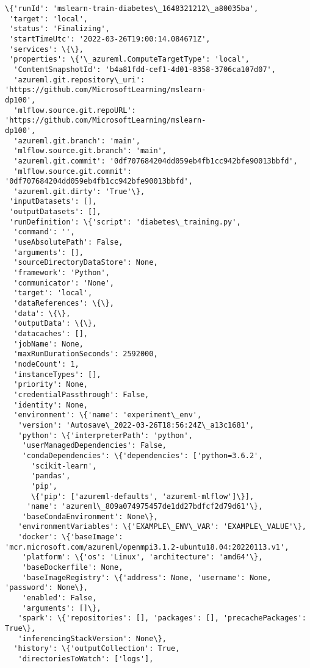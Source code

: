 \documentclass[11pt]{article}
\makeatletter
\newcommand{\boxspacing}{\kern\kvtcb@left@rule\kern\kvtcb@boxsep}
\newcommand{\prompt}[4]{
        {\ttfamily\llap{{\color{#2}[#3]:\hspace{3pt}#4}}\vspace{-\baselineskip}}
    }
\makeatother
\begin{document}
    
    
    
            \begin{tcolorbox}[breakable, size=fbox, boxrule=.5pt, pad at break*=1mm, opacityfill=0]
\prompt{Out}{outcolor}{4}{\boxspacing}
\begin{Verbatim}[commandchars=\\\{\}]
\{'runId': 'mslearn-train-diabetes\_1648321212\_a80035ba',
 'target': 'local',
 'status': 'Finalizing',
 'startTimeUtc': '2022-03-26T19:00:14.084671Z',
 'services': \{\},
 'properties': \{'\_azureml.ComputeTargetType': 'local',
  'ContentSnapshotId': 'b4a81fdd-cef1-4d01-8358-3706ca107d07',
  'azureml.git.repository\_uri': 'https://github.com/MicrosoftLearning/mslearn-
dp100',
  'mlflow.source.git.repoURL': 'https://github.com/MicrosoftLearning/mslearn-
dp100',
  'azureml.git.branch': 'main',
  'mlflow.source.git.branch': 'main',
  'azureml.git.commit': '0df707684204dd059eb4fb1cc942bfe90013bbfd',
  'mlflow.source.git.commit': '0df707684204dd059eb4fb1cc942bfe90013bbfd',
  'azureml.git.dirty': 'True'\},
 'inputDatasets': [],
 'outputDatasets': [],
 'runDefinition': \{'script': 'diabetes\_training.py',
  'command': '',
  'useAbsolutePath': False,
  'arguments': [],
  'sourceDirectoryDataStore': None,
  'framework': 'Python',
  'communicator': 'None',
  'target': 'local',
  'dataReferences': \{\},
  'data': \{\},
  'outputData': \{\},
  'datacaches': [],
  'jobName': None,
  'maxRunDurationSeconds': 2592000,
  'nodeCount': 1,
  'instanceTypes': [],
  'priority': None,
  'credentialPassthrough': False,
  'identity': None,
  'environment': \{'name': 'experiment\_env',
   'version': 'Autosave\_2022-03-26T18:56:24Z\_a13c1681',
   'python': \{'interpreterPath': 'python',
    'userManagedDependencies': False,
    'condaDependencies': \{'dependencies': ['python=3.6.2',
      'scikit-learn',
      'pandas',
      'pip',
      \{'pip': ['azureml-defaults', 'azureml-mlflow']\}],
     'name': 'azureml\_809a074975457de1dd27bdfcf2d79d61'\},
    'baseCondaEnvironment': None\},
   'environmentVariables': \{'EXAMPLE\_ENV\_VAR': 'EXAMPLE\_VALUE'\},
   'docker': \{'baseImage':
'mcr.microsoft.com/azureml/openmpi3.1.2-ubuntu18.04:20220113.v1',
    'platform': \{'os': 'Linux', 'architecture': 'amd64'\},
    'baseDockerfile': None,
    'baseImageRegistry': \{'address': None, 'username': None, 'password': None\},
    'enabled': False,
    'arguments': []\},
   'spark': \{'repositories': [], 'packages': [], 'precachePackages': True\},
   'inferencingStackVersion': None\},
  'history': \{'outputCollection': True,
   'directoriesToWatch': ['logs'],

\end{Verbatim}
\end{tcolorbox}
\end{document}
